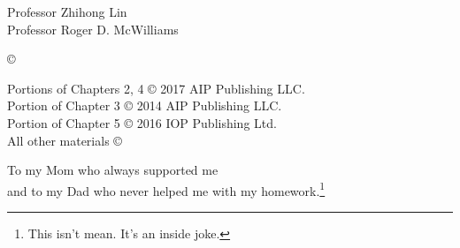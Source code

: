 




\othercommitteemembers
{
  Professor Zhihong Lin\\
  Professor Roger D. McWilliams
}


\copyrightdeclaration
{
  {\copyright} {\Degreeyear} \Authorname
}

\prepublishedcopyrightdeclaration
{
	Portions of Chapters 2, 4 {\copyright} 2017 AIP Publishing LLC. \\
	Portion of Chapter 3 {\copyright} 2014 AIP Publishing LLC. \\
	Portion of Chapter 5 {\copyright} 2016 IOP Publishing Ltd. \\
	All other materials {\copyright} {\Degreeyear} \Authorname
}

\dedications
{
To my Mom who always supported me \\and to my Dad who never helped me with my homework.\footnote{This isn't mean. It's an inside joke.}
}

